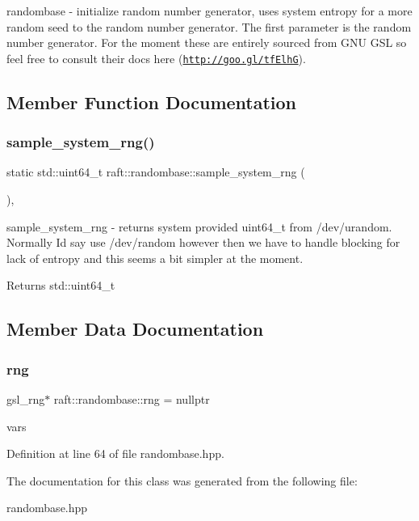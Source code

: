 randombase -\/ initialize random number generator, uses system entropy for a more random seed to the random number generator. The first parameter is the random number generator. For the moment these are entirely sourced from G\+NU G\+SL so feel free to consult their docs here (\href{http://goo.gl/tfElhG}{\tt http\+://goo.\+gl/tf\+ElhG}). 

\subsection{Member Function Documentation}
\hypertarget{classraft_1_1randombase_a50348491bf2bdba0de927582c0fee493}{}\label{classraft_1_1randombase_a50348491bf2bdba0de927582c0fee493} 
\subsubsection{\texorpdfstring{sample\+\_\+system\+\_\+rng()}{sample\_system\_rng()}}
{\footnotesize\ttfamily static std\+::uint64\+\_\+t raft\+::randombase\+::sample\+\_\+system\+\_\+rng (\begin{DoxyParamCaption}{ }\end{DoxyParamCaption})\hspace{0.3cm}{\ttfamily [static]}, {\ttfamily [protected]}}

sample\+\_\+system\+\_\+rng -\/ returns system provided uint64\+\_\+t from /dev/urandom. Normally I\textquotesingle{}d say use /dev/random however then we have to handle blocking for lack of entropy and this seems a bit simpler at the moment. \begin{DoxyReturn}{Returns}
std\+::uint64\+\_\+t 
\end{DoxyReturn}


\subsection{Member Data Documentation}
\hypertarget{classraft_1_1randombase_a0e76811a01930066c262f9cecfd684b9}{}\label{classraft_1_1randombase_a0e76811a01930066c262f9cecfd684b9} 
\subsubsection{\texorpdfstring{rng}{rng}}
{\footnotesize\ttfamily gsl\+\_\+rng$\ast$ raft\+::randombase\+::rng = nullptr\hspace{0.3cm}{\ttfamily [protected]}}

vars 

Definition at line 64 of file randombase.\+hpp.



The documentation for this class was generated from the following file\+:\begin{DoxyCompactItemize}
\item 
randombase.\+hpp\end{DoxyCompactItemize}
